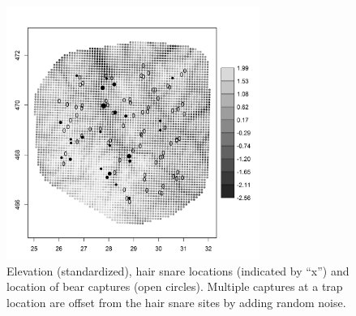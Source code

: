 \begin{figure}[ht]
\centering
\includegraphics[width=3.25in,height=3.25in]{Ch13-RSF/figs/elev_captures_bw.png}
\caption{
Elevation (standardized), hair snare locations (indicated by ``x'') and location
of bear captures (open circles).
Multiple captures at a trap location are offset from the hair snare
sites by adding
random noise.
}
\label{fig.elevation}
\end{figure}



